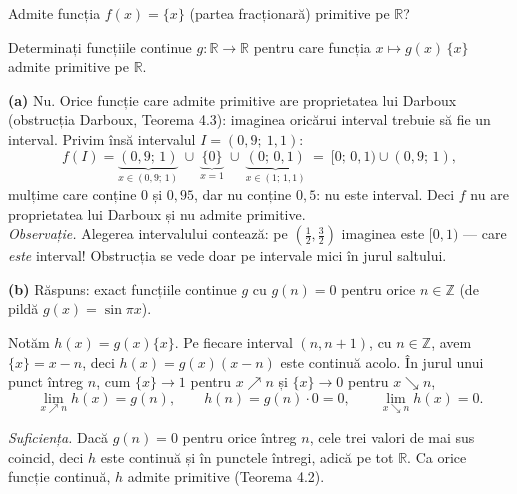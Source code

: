 \begin{parti}
  \item Admite funcția $f(x)=\{x\}$ (partea fracționară) primitive pe $\mathbb{R}$?
  \item Determinați funcțiile continue $g:\mathbb{R}\to\mathbb{R}$ pentru care funcția
        $x\mapsto g(x)\,\{x\}$ admite primitive pe $\mathbb{R}$.
\end{parti}
\sol \textbf{(a)} Nu. Orice funcție care admite primitive are proprietatea lui Darboux (obstrucția Darboux, Teorema 4.3): imaginea oricărui interval trebuie să fie un interval. Privim însă intervalul $I=(0{,}9;\ 1{,}1)$:
\[ f(I)=\underbrace{(0{,}9;\,1)}_{x\in(0,9;\,1)}\ \cup\ \underbrace{\{0\}}_{x=1}\ \cup\ \underbrace{(0;\,0{,}1)}_{x\in(1;\,1{,}1)}\ =\ [0;\,0{,}1)\cup(0{,}9;\,1), \]
mulțime care conține $0$ și $0{,}95$, dar nu conține $0{,}5$: nu este interval. Deci $f$ nu are proprietatea lui Darboux și nu admite primitive.\\[2pt]
\emph{Observație.} Alegerea intervalului contează: pe $\left(\frac12,\frac32\right)$ imaginea este $[0,1)$ --- care \emph{este} interval! Obstrucția se vede doar pe intervale mici în jurul saltului.

\textbf{(b)} Răspuns: exact funcțiile continue $g$ cu $g(n)=0$ pentru orice $n\in\mathbb{Z}$ (de pildă $g(x)=\sin\pi x$).

Notăm $h(x)=g(x)\{x\}$. Pe fiecare interval $(n,n+1)$, cu $n\in\mathbb{Z}$, avem $\{x\}=x-n$, deci $h(x)=g(x)(x-n)$ este continuă acolo. În jurul unui punct întreg $n$, cum $\{x\}\to1$ pentru $x\nearrow n$ și $\{x\}\to0$ pentru $x\searrow n$,
\[ \lim_{x\nearrow n}h(x)=g(n),\qquad h(n)=g(n)\cdot0=0,\qquad \lim_{x\searrow n}h(x)=0 . \]

\emph{Suficiența.} Dacă $g(n)=0$ pentru orice întreg $n$, cele trei valori de mai sus coincid, deci $h$ este continuă și în punctele întregi, adică pe tot $\mathbb{R}$. Ca orice funcție continuă, $h$ admite primitive (Teorema 4.2).

